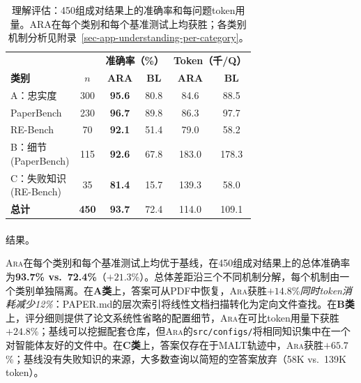 \documentclass[
]{article}
\makeatletter
\let\oldparagraph\paragraph
\renewcommand{\paragraph}{
    \@ifstar
      \xxxParagraphStar
      \xxxParagraphNoStar
  }
\newcommand{\xxxParagraphStar}[1]{\oldparagraph*{#1}\mbox{}}
\newcommand{\xxxParagraphNoStar}[1]{\oldparagraph{#1}\mbox{}}
\newcommand{\passthrough}[1]{#1}
\theoremstyle{definition}
\newcommand{\ara}{\textsc{Ara}}
\makeatother
\begin{document}
\begin{table}[t]
\centering
\small
\begin{tabular}{lc cc cc}
\toprule
& & \multicolumn{2}{c}{\textbf{准确率（\%）}} & \multicolumn{2}{c}{\textbf{Token（千/Q）}} \\
\cmidrule(lr){3-4} \cmidrule(lr){5-6}
\textbf{类别} & $n$ & \textbf{ARA} & \textbf{BL} & \textbf{ARA} & \textbf{BL} \\
\midrule
A：忠实度                & 300 & \textbf{95.6} & 80.8 & 84.6 & 88.5 \\
\quad PaperBench           & 230 & \textbf{96.7} & 89.8 & 86.3 & 97.7 \\
\quad RE-Bench             &  70 & \textbf{92.1} & 51.4 & 79.0 & 58.2 \\
\addlinespace
\shortstack[l]{B：细节 \\ \scriptsize(PaperBench)} & 115 & \textbf{92.6} & 67.8 & 183.0 & 178.3 \\
\addlinespace
\shortstack[l]{C：失败知识 \\ \scriptsize(RE-Bench)}  &  35 & \textbf{81.4} & 15.7 & 139.3 & 58.0 \\
\midrule
\textbf{总计}           & \textbf{450} & \textbf{93.7} & 72.4 & 114.0 & 109.1 \\
\bottomrule
\end{tabular}
\caption{理解评估：450组成对结果上的准确率和每问题token用量。ARA在每个类别和每个基准测试上均获胜；各类别机制分析见附录~\ref{sec-app-understanding-per-category}。}
\label{tab-understanding}
\end{table}

\paragraph{结果。}\label{ux7ed3ux679c}

\ara{}在每个类别和每个基准测试上均优于基线，在450组成对结果上的总体准确率为\textbf{93.7\%
vs.~72.4\%}（\(+21.3\)\%）。总体差距沿三个不同机制分解，每个机制由一个类别单独隔离。在\textbf{A类}上，答案可从PDF中恢复，\ara{}获胜\(+14.8\)\%\emph{同时token消耗减少12\%}：PAPER.md的层次索引将线性文档扫描转化为定向文件查找。在\textbf{B类}上，评分细则提供了论文系统性省略的配置细节，\ara{}在可比token用量下获胜\(+24.8\)\%；基线可以挖掘配套仓库，但\ara{}的\passthrough{\lstinline!src/configs/!}将相同知识集中在一个对智能体友好的文件中。在\textbf{C类}上，答案仅存在于MALT轨迹中，\ara{}获胜\(+65.7\)\%；基线没有失败知识的来源，大多数查询以简短的空答案放弃（58K
vs.~139K token）。
\end{document}
